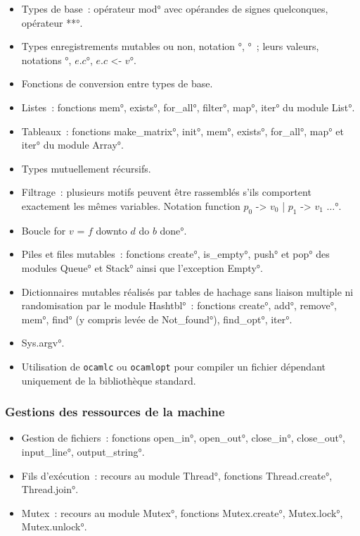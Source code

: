 \begin{itemize}
\item Types de base~: opérateur \°mod° avec opérandes de signes quelconques, opérateur \°**°.
\item 
Types enregistrements mutables ou non, notation °, °~; leurs valeurs, notations °, \°$e$.$c$°, \°$e$.$c$ <- $v$°.
\item Fonctions de conversion entre types de base.
\item Listes~: fonctions \°mem°, \°exists°, \°for_all°, \°filter°, \°map°, \°iter° du module \°List°.
\item Tableaux~: fonctions \°make_matrix°, \°init°, \°mem°, \°exists°, \°for_all°, \°map° et \°iter° du module \°Array°.
\item Types mutuellement récursifs.
\item Filtrage~: plusieurs motifs peuvent être rassemblés s'ils comportent exactement les mêmes variables. Notation \°function $p_0$ -> $v_0$ | $p_1$ -> $v_1$ $\dots$°.
\item Boucle \°for $v$ = $f$ downto $d$ do $b$ done°.
\item Piles et files mutables~: fonctions \°create°, \°is_empty°, \°push° et \°pop° des modules \°Queue° et \°Stack° ainsi que l'exception \°Empty°.
\item 
Dictionnaires mutables réalisés par tables de hachage sans liaison multiple ni randomisation par le module \°Hashtbl°~: fonctions \°create°, \°add°, \°remove°, \°mem°, \°find° (y compris levée de \°Not_found°), \°find_opt°, \°iter°.
\item \°Sys.argv°.
\item Utilisation de \texttt{ocamlc} ou \texttt{ocamlopt} pour compiler un fichier dépendant uniquement de la bibliothèque standard.
\end{itemize}

\subsubsection*{Gestions des ressources de la machine}


\begin{itemize}
\item Gestion de fichiers~: fonctions \°open_in°, \°open_out°, \°close_in°, \°close_out°, \°input_line°, \°output_string°.
\item Fils d'exécution~: recours au module \°Thread°, fonctions \°Thread.create°, \°Thread.join°.
\item Mutex~: recours au module \°Mutex°, fonctions \°Mutex.create°, \°Mutex.lock°, \°Mutex.unlock°.
\end{itemize}
